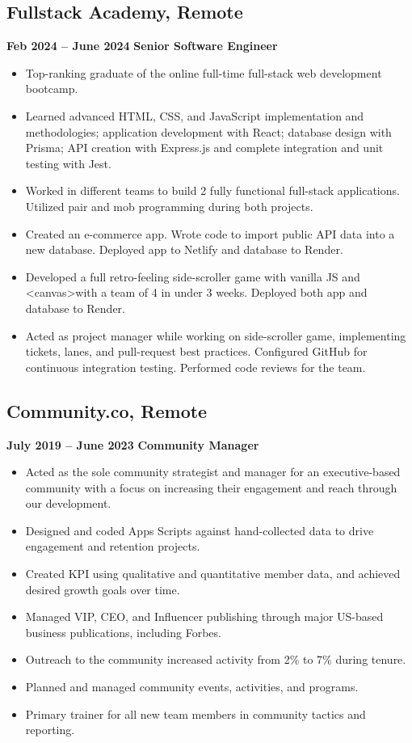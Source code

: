 \documentclass[a4paper,9pt]{article}
\begin{document}
\subsection{Fullstack Academy, Remote} \hfill \textbf{Feb 2024 – June 2024}
\textbf{Senior Software Engineer}
\begin{itemize}[leftmargin=1em, itemsep=0pt, parsep=0pt]
    \item Top-ranking graduate of the online full-time full-stack web
          development bootcamp.
    \item Learned advanced HTML, CSS, and JavaScript implementation and
          methodologies; application development with React; database design with Prisma;
          API creation with Express.js and complete integration and unit testing with
          Jest.
    \item Worked in different teams to build 2 fully functional full-stack
          applications. Utilized pair and mob programming during both projects.
    \item Created an e-commerce app. Wrote code to import public API data into
          a new database. Deployed app to Netlify and database to Render.
    \item Developed a full retro-feeling side-scroller game with vanilla JS and
          \textless canvas\textgreater with a team of 4 in under 3 weeks. Deployed both
          app and database to Render.
    \item Acted as project manager while working on side-scroller game,
          implementing tickets, lanes, and pull-request best practices. Configured GitHub
          for continuous integration testing. Performed code reviews for the team.
\end{itemize}

\subsection{Community.co, Remote} \hfill \textbf{July 2019 – June 2023}
\textbf{Community Manager}
\begin{itemize}[leftmargin=1em, itemsep=0pt, parsep=0pt]
    \item Acted as the sole community strategist and manager for an
          executive-based community with a focus on increasing their engagement and reach
          through our development.
    \item Designed and coded Apps Scripts against hand-collected data to drive
          engagement and retention projects.
    \item Created KPI using qualitative and quantitative member data, and
          achieved desired growth goals over time.
    \item Managed VIP, CEO, and Influencer publishing through major US-based
          business publications, including Forbes.
    \item Outreach to the community increased activity from 2\% to 7\% during
          tenure.
    \item Planned and managed community events, activities, and programs.
    \item Primary trainer for all new team members in community tactics and
          reporting.
\end{itemize}
\end{document}
